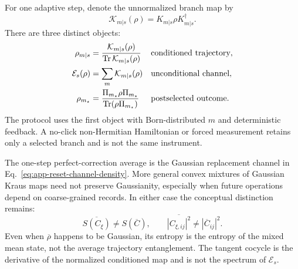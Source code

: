 For one adaptive step, denote the unnormalized branch map by
\begin{equation}
    \mathcal K_{m|s}(\rho)
    =K_{m|s}\rho K_{m|s}^\dagger.
\end{equation}
There are three distinct objects:
\begin{align}
    \rho_{m|s}
    &=\frac{\mathcal K_{m|s}(\rho)}
      {\operatorname{Tr}\mathcal K_{m|s}(\rho)}
      &&\text{conditioned trajectory},\\
    \mathcal E_s(\rho)
    &=\sum_m\mathcal K_{m|s}(\rho)
      &&\text{unconditional channel},\\
    \rho_{m_\star}
    &=\frac{\Pi_{m_\star}\rho\Pi_{m_\star}}
      {\operatorname{Tr}(\rho\Pi_{m_\star})}
      &&\text{postselected outcome}.
    \label{eq:app-three-ensemble-objects}
\end{align}
The protocol uses the first object with Born-distributed \(m\) and
deterministic feedback.  A no-click non-Hermitian Hamiltonian or forced
measurement retains only a selected branch and is not the same instrument.

The one-step perfect-correction average is the Gaussian replacement channel
in Eq.~\eqref{eq:app-reset-channel-density}.  More general convex mixtures
of Gaussian Kraus maps need not preserve Gaussianity, especially when future
operations depend on coarse-grained records.  In either case the conceptual
distinction remains:
\begin{equation}
    \overline{S(C_\xi)}\ne S(\overline C),
    \qquad
    \overline{|C_{\xi,ij}|^2}\ne|\overline C_{ij}|^2.
    \label{eq:app-mean-trajectory-nonlinearity}
\end{equation}
Even when \(\overline\rho\) happens to be Gaussian, its entropy is the
entropy of the mixed mean state, not the average trajectory entanglement.
The tangent cocycle is the derivative of the normalized conditioned map and
is not the spectrum of \(\mathcal E_s\).

